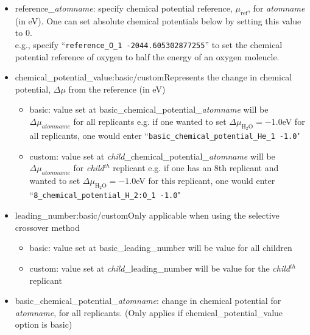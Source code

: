\begin{itemize}

\item reference\_{\em atomname}: specify chemical potential reference, $\mu_{{\mathrm {ref}}}$, for {\em atomname} (in eV). One can set absolute chemical potentials below by setting this value to 0.\\
e.g., specify ``\texttt{reference\_O\_1 \hspace{7 mm} -2044.605302877255}'' to set the chemical potential reference of oxygen to half the energy of an oxygen moleucle.

\item chemical\_potential\_value:basic/custom\newline Represents the change in chemical potential, $\Delta \mu$ from the reference (in eV)
\begin{itemize}
 \item basic: value set at basic\_chemical\_potential\_{\em atomname} will be $\Delta \mu_{atomname}$ for all replicants\newline
 e.g. if one wanted to set $\Delta \mu_{\mathrm {H_{2}O}} = -1.0$eV for all replicants, one would enter ``\texttt{basic\_chemical\_potential\_He\_1 \hspace{7 mm} -1.0}"
 \item custom: value set at {\em child}\_chemical\_potential\_{\em atomname} will be $\Delta \mu_{atomname}$ for {\em child}$^{th}$ replicant\newline
 e.g. if one has an 8th replicant and wanted to set $\Delta \mu_{\mathrm {H_{2}O}} = -1.0$eV for this replicant, one would enter ``\texttt{8\_chemical\_potential\_H\_2:O\_1 \hspace{7 mm} -1.0}"
\end{itemize}

\item leading\_number:basic/custom\newline Only applicable when using the selective crossover method
\begin{itemize}
 \item basic: value set at basic\_leading\_number will be value for all children
 \item custom: value set at {\em child}\_leading\_number will be value for the {\em child}$^{th}$ replicant
\end{itemize}

\item basic\_chemical\_potential\_{\em atomname}: change in chemical potential for {\em atomname}, for all replicants.
(Only applies if chemical\_potential\_value option is basic)


\end{itemize}
